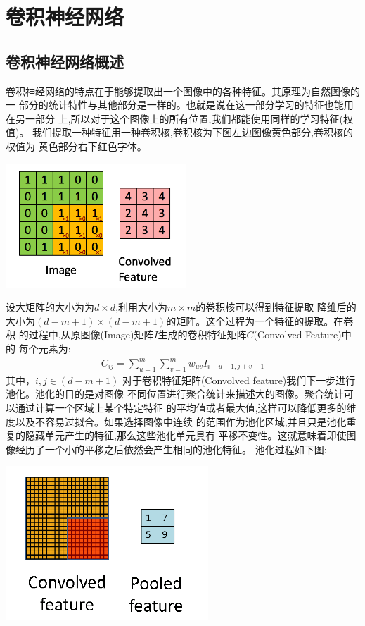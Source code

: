 \section{卷积神经网络}
\subsection{卷积神经网络概述}
卷积神经网络的特点在于能够提取出一个图像中的各种特征。其原理为自然图像的一
部分的统计特性与其他部分是一样的。也就是说在这一部分学习的特征也能用在另一部分
上,所以对于这个图像上的所有位置,我们都能使用同样的学习特征(权值)。
我们提取一种特征用一种卷积核,卷积核为下图左边图像黄色部分,卷积核的权值为
黄色部分右下红色字体。
\begin{center}
\includegraphics[scale=0.7]{../figures/conv.png} 
\end{center}
设大矩阵的大小为为$d\times d$,利用大小为$m\times m$的卷积核可以得到特征提取
降维后的大小为$(d-m+1)\times(d-m+1)$的矩阵。这个过程为一个特征的提取。在卷积
的过程中,从原图像(Image)矩阵$I$生成的卷积特征矩阵$C$(Convolved Feature)中的
每个元素为:
\begin{eqnarray}
C_{ij}=\sum_{u=1}^m\sum_{v=1}^mw_{uv}I_{i+u-1,j+v-1}
\end{eqnarray}
其中，$i,j\in(d-m+1)$
对于卷积特征矩阵(Convolved feature)我们下一步进行池化。池化的目的是对图像
不同位置进行聚合统计来描述大的图像。聚合统计可以通过计算一个区域上某个特定特征
的平均值或者最大值,这样可以降低更多的维度以及不容易过拟合。如果选择图像中连续
的范围作为池化区域,并且只是池化重复的隐藏单元产生的特征,那么这些池化单元具有
平移不变性。这就意味着即使图像经历了一个小的平移之后依然会产生相同的池化特征。
池化过程如下图:
\begin{center}
\includegraphics[scale=0.7]{../figures/pool.png} 
\end{center}
